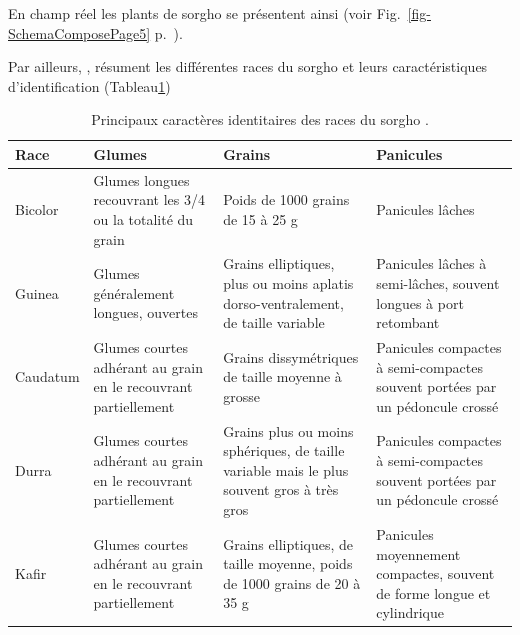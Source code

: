 \documentclass[a4paper,11pt]{article}
\begin{document}
En champ réel les plants de sorgho se présentent ainsi (voir
Fig.~\ref{fig-SchemaComposePage5}
p.~\pageref{fig-SchemaComposePage5}).


Par ailleurs, , résument les différentes races du sorgho et
leurs caractéristiques d'identification (Tableau\ref{tableau:Chantereau_2013})

\begin{table}
\begin{center}
\begin{tabular}{lp{4cm}p{4cm}p{4cm}}
  Race  & Glumes  & Grains  & Panicules  \\ \hline
  Bicolor  & Glumes longues recouvrant les 3/4 ou la totalité du grain  & Poids de 1000 grains de 15 à 25 g  & Panicules lâches \\ \hline
  Guinea  & Glumes généralement longues, ouvertes & Grains elliptiques, plus ou moins aplatis dorso-ventralement, de taille variable & Panicules lâches à semi-lâches, souvent longues à port retombant \\ \hline
  Caudatum & Glumes courtes adhérant au grain en le recouvrant partiellement & Grains dissymétriques de taille moyenne à grosse & Panicules compactes à semi-compactes souvent portées par un pédoncule crossé \\ \hline
  Durra & Glumes courtes adhérant au grain en le recouvrant partiellement & Grains plus ou moins sphériques, de taille variable mais le plus souvent gros à très gros & Panicules compactes à semi-compactes souvent portées par un pédoncule crossé \\ \hline
  Kafir & Glumes courtes adhérant au grain en le recouvrant partiellement & Grains elliptiques, de taille moyenne, poids de 1000 grains de 20 à 35 g & Panicules moyennement compactes, souvent de forme longue et cylindrique \\ \hline
\end{tabular}
\caption{Principaux caractères identitaires des races du sorgho \protect\cite{Chantereau_2013}.}
\label{tableau:Chantereau_2013}
\end{center}
\end{table}


 
\end{document}
